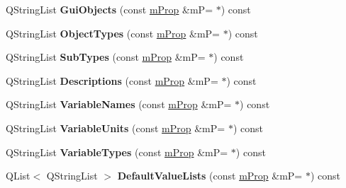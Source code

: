 \begin{DoxyCompactItemize}
\item 
\mbox{\label{classm_prop_list_abbe8180f2c62aab5d10ad89da1a4a564}} 
Q\+String\+List {\bfseries Gui\+Objects} (const \hyperlink{classm_prop}{m\+Prop} \&mP=\textquotesingle{} $\ast$\textquotesingle{}) const
\item 
\mbox{\label{classm_prop_list_a4a09a7f63582985b782aa7f5531b5fac}} 
Q\+String\+List {\bfseries Object\+Types} (const \hyperlink{classm_prop}{m\+Prop} \&mP=\textquotesingle{} $\ast$\textquotesingle{}) const
\item 
\mbox{\label{classm_prop_list_acb336eee4cd68580ba9874844c9440a9}} 
Q\+String\+List {\bfseries Sub\+Types} (const \hyperlink{classm_prop}{m\+Prop} \&mP=\textquotesingle{} $\ast$\textquotesingle{}) const
\item 
\mbox{\label{classm_prop_list_a95ba2457dac881d71278c8e697b0ee9a}} 
Q\+String\+List {\bfseries Descriptions} (const \hyperlink{classm_prop}{m\+Prop} \&mP=\textquotesingle{} $\ast$\textquotesingle{}) const
\item 
\mbox{\label{classm_prop_list_a5a965adac87d8440053f798d0777027c}} 
Q\+String\+List {\bfseries Variable\+Names} (const \hyperlink{classm_prop}{m\+Prop} \&mP=\textquotesingle{} $\ast$\textquotesingle{}) const
\item 
\mbox{\label{classm_prop_list_a36fd2f8d895475ef69848f0f35e09d6b}} 
Q\+String\+List {\bfseries Variable\+Units} (const \hyperlink{classm_prop}{m\+Prop} \&mP=\textquotesingle{} $\ast$\textquotesingle{}) const
\item 
\mbox{\label{classm_prop_list_a5fd74676c4521e69805f53af31bef3f8}} 
Q\+String\+List {\bfseries Variable\+Types} (const \hyperlink{classm_prop}{m\+Prop} \&mP=\textquotesingle{} $\ast$\textquotesingle{}) const
\item 
\mbox{\label{classm_prop_list_a04d4bd203f9584092fbc43a8d9bf71d8}} 
Q\+List$<$ Q\+String\+List $>$ {\bfseries Default\+Value\+Lists} (const \hyperlink{classm_prop}{m\+Prop} \&mP=\textquotesingle{} $\ast$\textquotesingle{}) const
\item 
\mbox{\label{classm_prop_list_aba65bef2d1cb57840325d6ec77c30335}} 

\end{DoxyCompactItemize}
